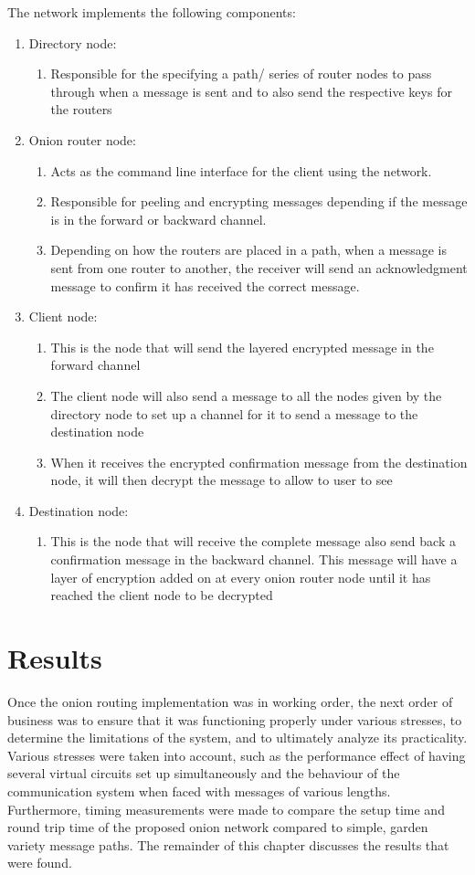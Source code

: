 \documentclass[10pt]{report}
\begin{document}
The network implements the following components:
\begin{enumerate}
	\item Directory node: 
	\begin{enumerate}
        \item Responsible for the specifying a path/ series of router nodes to pass
		through when a message is sent and to also send the respective keys for the routers
	\end{enumerate}
	\item Onion router node: 
	\begin{enumerate}   
	    \item Acts as the command line interface for the client using the network.
	    \item Responsible for peeling and encrypting messages depending if the message is in the forward or backward channel.
		\item Depending on how the routers are placed in a path, when a message is sent from one router to another, the receiver will send an acknowledgment message to confirm it has received the correct message.
	\end{enumerate}
    \item Client node:
    \begin{enumerate}
        \item This is the node that will send the layered encrypted message in the forward channel
		\item The client node will also send a message to all the nodes given by the directory node
			to set up a channel for it to send a message to the destination node
		\item When it receives the encrypted confirmation message from the destination node, it will
			then decrypt the message to allow to user to see
    \end{enumerate}
	\item Destination node: 
	\begin{enumerate}
	    \item This is the node that will receive the complete message also send back a
		confirmation message in the backward channel. This message will have a layer of encryption
		added on at every onion router node until it has reached the client node to be decrypted
	\end{enumerate}
\end{enumerate}

\chapter{Results}
Once the onion routing implementation was in working order, the next order of business was to ensure
that it was functioning properly under various stresses, to determine the limitations of the system,
and to ultimately analyze its practicality. Various stresses were taken into account, such as the
performance effect of having several virtual circuits set up simultaneously and the behaviour of the
communication system when faced with messages of various lengths. Furthermore, timing measurements
were made to compare the setup time and round trip time of the proposed onion network compared to
simple, garden variety message paths. The remainder of this chapter discusses the results that were
found.
\end{document}
